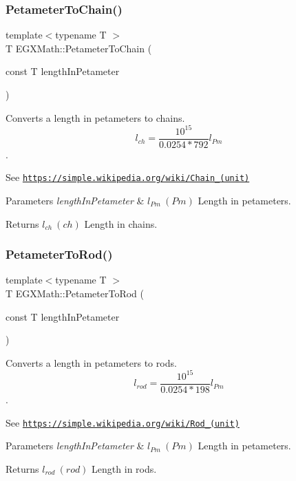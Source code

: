 \subsubsection{\texorpdfstring{Petameter\+To\+Chain()}{PetameterToChain()}}
{\footnotesize\ttfamily template$<$typename T $>$ \\
T E\+G\+X\+Math\+::\+Petameter\+To\+Chain (\begin{DoxyParamCaption}\item[{const T}]{length\+In\+Petameter }\end{DoxyParamCaption})}



Converts a length in petameters to chains. \[ l_{ch}= \frac{10^{15}}{0.0254 * 792} l_{Pm} \]. 

See \href{https://simple.wikipedia.org/wiki/Chain_(unit)}{\tt https\+://simple.\+wikipedia.\+org/wiki/\+Chain\+\_\+(unit)} 
\begin{DoxyParams}{Parameters}
{\em length\+In\+Petameter} & $ l_{Pm}\ (Pm)$ Length in petameters. \\
\hline
\end{DoxyParams}
\begin{DoxyReturn}{Returns}
$ l_{ch}\ (ch)$ Length in chains. 
\end{DoxyReturn}
\mbox{\label{group___e_g_x_math-_conversions-_length_conversions-_petameter-_surveyors_gae7cef029bdb3e7ace9aa08e0183cc202}} 
\subsubsection{\texorpdfstring{Petameter\+To\+Rod()}{PetameterToRod()}}
{\footnotesize\ttfamily template$<$typename T $>$ \\
T E\+G\+X\+Math\+::\+Petameter\+To\+Rod (\begin{DoxyParamCaption}\item[{const T}]{length\+In\+Petameter }\end{DoxyParamCaption})}



Converts a length in petameters to rods. \[ l_{rod}= \frac{10^{15}}{0.0254 * 198} l_{Pm} \]. 

See \href{https://simple.wikipedia.org/wiki/Rod_(unit)}{\tt https\+://simple.\+wikipedia.\+org/wiki/\+Rod\+\_\+(unit)} 
\begin{DoxyParams}{Parameters}
{\em length\+In\+Petameter} & $ l_{Pm}\ (Pm)$ Length in petameters. \\
\hline
\end{DoxyParams}
\begin{DoxyReturn}{Returns}
$ l_{rod}\ (rod)$ Length in rods. 
\end{DoxyReturn}
